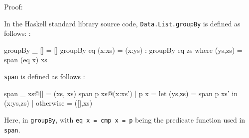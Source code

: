 \documentclass[../main.tex]{subfiles}
\begin{document}
Proof:

In the Haskell standard library source code, \texttt{Data.List.groupBy} is defined as follows: \cite{hstdlib}:

\begin{code}
groupBy _  []           =  []
groupBy eq (x:xs)       =  (x:ys) : groupBy eq zs
where (ys,zs) = span (eq x) xs
\end{code}

\texttt{span} is defined as follows \cite{hstdlib}:

\begin{code}
span _ xs@[]            =  (xs, xs)
span p xs@(x:xs')
| p x          =  let (ys,zs) = span p xs' in (x:ys,zs)
| otherwise    =  ([],xs)
\end{code}





Here,  in \texttt{groupBy}, with \texttt{eq x = cmp x = p} being the predicate function used in \texttt{span}. %



\end{document}
